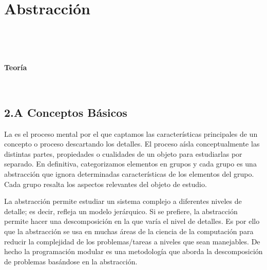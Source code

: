 
\chapter{Abstracción} \label{chap:abstracccion}

\localtableofcontents

\

\

\centerline{\Large \bf Teoría}

\formatoNormal



\

\section*{2.A Conceptos Básicos} 
 

La   es el proceso mental por el que captamos las características principales de un concepto o proceso descartando los detalles. El proceso aísla conceptualmente las distintas partes, propiedades o cualidades de un objeto para estudiarlas por separado. En definitiva, categorizamos elementos en grupos y cada grupo es una abstracción que ignora determinadas características de los elementos del grupo. Cada grupo resalta los aspectos relevantes del objeto de estudio. 

La abstracción permite estudiar un sistema complejo a diferentes niveles de detalle; es decir, refleja un modelo jerárquico. Si se prefiere, la abstracción permite hacer una descomposición en la que varía el nivel de detalles. Es por ello que la abstracción se usa en muchas áreas de la ciencia de la computación para reducir la complejidad de los problemas/tareas a niveles que sean manejables. De hecho la programación modular es una metodología que aborda la descomposición de problemas basándose en la abstracción.



